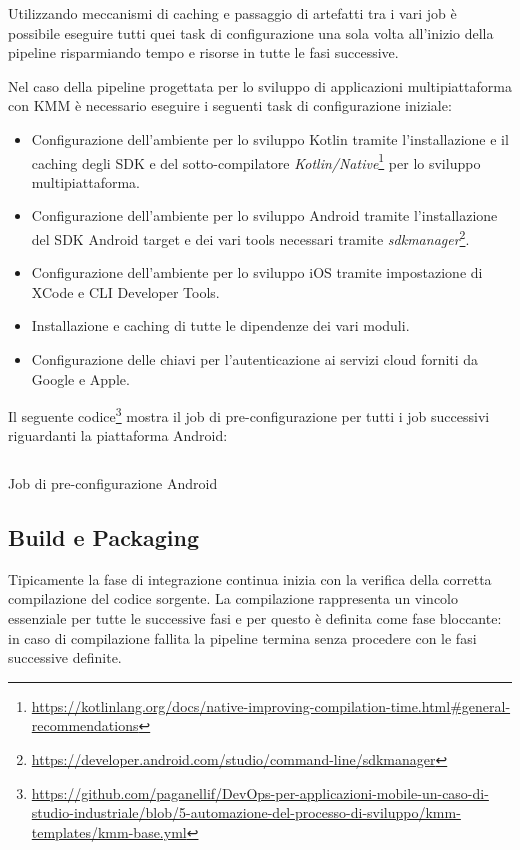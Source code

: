 Utilizzando meccanismi di caching e passaggio di artefatti tra i vari job è possibile eseguire tutti quei task di configurazione una sola volta all'inizio della pipeline risparmiando tempo e risorse in tutte le fasi successive.

Nel caso della pipeline progettata per lo sviluppo di applicazioni multipiattaforma con KMM è necessario eseguire i seguenti task di configurazione iniziale:
\begin{itemize}
    \item Configurazione dell'ambiente per lo sviluppo Kotlin tramite l'installazione e il caching degli SDK e del sotto-compilatore \textit{Kotlin/Native}\footnote{\href{https://kotlinlang.org/docs/native-improving-compilation-time.html\#general-recommendations}{https://kotlinlang.org/docs/native-improving-compilation-time.html\#general-recommendations}} per lo sviluppo multipiattaforma.
    \item Configurazione dell'ambiente per lo sviluppo Android tramite l'installazione del SDK Android target e dei vari tools necessari tramite \textit{sdkmanager}\footnote{\href{https://developer.android.com/studio/command-line/sdkmanager}{https://developer.android.com/studio/command-line/sdkmanager}}.
    \item Configurazione dell'ambiente per lo sviluppo iOS tramite impostazione di XCode e CLI Developer Tools.
    \item Installazione e caching di tutte le dipendenze dei vari moduli.
    \item Configurazione delle chiavi per l'autenticazione ai servizi cloud forniti da Google e Apple.
\end{itemize}

Il seguente codice\footnote{\href{https://github.com/paganellif/DevOps-per-applicazioni-mobile-un-caso-di-studio-industriale/blob/5-automazione-del-processo-di-sviluppo/kmm-templates/kmm-base.yml}{https://github.com/paganellif/DevOps-per-applicazioni-mobile-un-caso-di-studio-industriale/blob/5-automazione-del-processo-di-sviluppo/kmm-templates/kmm-base.yml}} mostra il job di pre-configurazione per tutti i job successivi riguardanti la piattaforma Android:

\begin{listing}[H]
    \inputminted{yaml}{code/pre-android-job.yaml}
    \caption{Job di pre-configurazione Android}
\end{listing}

\subsection{Build e Packaging}
Tipicamente la fase di integrazione continua inizia con la verifica della corretta compilazione del codice sorgente. La compilazione rappresenta un vincolo essenziale per tutte le successive fasi e per questo è definita come fase bloccante: in caso di compilazione fallita la pipeline termina senza procedere con le fasi successive definite.

